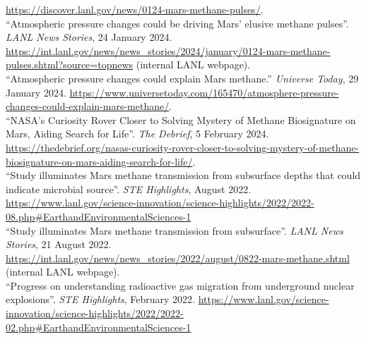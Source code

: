 \documentclass[11pt, letterpaper]{article}
\newcommand{\years}[1]{\marginnote{\scriptsize #1}}
\begin{document}
{{\href{https://discover.lanl.gov/news/0124-mars-methane-pulses/}
{https://discover.lanl.gov/news/0124-mars-methane-pulses/}.\\
%
\years{2024}``Atmospheric pressure changes could be driving Mars' elusive
methane pulses''.  \emph{LANL News Stories}, 24 January 2024.
\href{https://int.lanl.gov/news/news\_stories/2024/january/0124-mars-methane-pulses.shtml?source=topnews}
{https://int.lanl.gov/news/news\_stories/2024/january/0124-mars-methane-pulses.shtml?source=topnews}
(internal LANL webpage).\\
%
\years{2024}``Atmospheric pressure changes could explain Mars methane.''
\emph{Universe Today}, 29 January 2024.
\href{https://www.universetoday.com/165470/atmosphere-pressure-changes-could-explain-mars-methane/}
{https://www.universetoday.com/165470/atmosphere-pressure-changes-could-explain-mars-methane/}.\\
%
%
\years{2024}``NASA's Curiosity Rover Closer to Solving Mystery of Methane Biosignature on Mars, Aiding Search for Life''.
\emph{The Debrief}, 5 February 2024.
\href{https://thedebrief.org/nasas-curiosity-rover-closer-to-solving-mystery-of-methane-biosignature-on-mars-aiding-search-for-life/}{https://thedebrief.org/nasas-curiosity-rover-closer-to-solving-mystery-of-methane-biosignature-on-mars-aiding-search-for-life/}.\\
%
\years{2022}``Study illuminates Mars methane transmission from subsurface
depths that could indicate microbial source''.
\emph{STE Highlights}, August 2022. 
\href{https://www.lanl.gov/science-innovation/science-highlights/2022/2022-08.php#EarthandEnvironmentalSciences-1}
{https://www.lanl.gov/science-innovation/science-highlights/2022/2022-08.php\#EarthandEnvironmentalSciences-1}\\
%
\years{2022}``Study illuminates Mars methane transmission from subsurface''.
\emph{LANL News Stories}, 21 August
2022. \href{https://int.lanl.gov/news/news\_stories/2022/august/0822-mars-methane.shtml}
{https://int.lanl.gov/news/news\_stories/2022/august/0822-mars-methane.shtml}
(internal LANL webpage).\\
%
\years{2022}``Progress on
understanding radioactive gas migration from underground nuclear explosions''. 
\emph{STE Highlights}, February 2022.
\href{https://www.lanl.gov/science-innovation/science-highlights/2022/2022-02.php#EarthandEnvironmentalSciences-1}{https://www.lanl.gov/science-innovation/science-highlights/2022/2022-02.php\#EarthandEnvironmentalSciences-1}\\



}}
\end{document}
